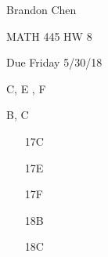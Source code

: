 \documentclass[11pt]{article}
\begin{document}
\noindent Brandon Chen

\noindent MATH 445 HW 8

\noindent Due Friday 5/30/18

 C, E , F

 B, C

\begin{itemize}

\item[17C]

\item[17E]

\item[17F]

\item[18B]

\item[18C]


\end{itemize}
\end{document}
